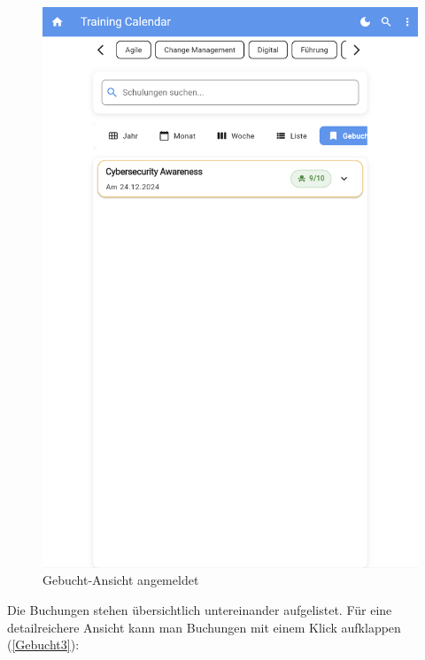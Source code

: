 \begin{itemize}
\begin{figure}[htbp!]
        \centering
        \includegraphics[scale=0.2]{img/flutter_20.png}
        \caption{Gebucht-Ansicht angemeldet}
        \label{Gebucht2}
    \end{figure}
Die Buchungen stehen übersichtlich untereinander aufgelistet. Für eine detailreichere Ansicht kann man Buchungen mit einem Klick aufklappen (\ref{Gebucht3}):
\begin{figure}[htbp!]
        \centering

\end{figure}
\end{itemize}

